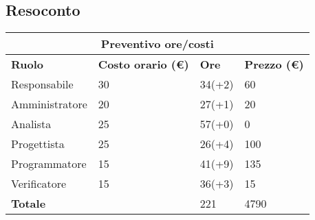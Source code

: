 \documentclass[12pt]{article}
\begin{document}
\subsection{Resoconto}
\begin{center}
    \begin{tabularx}{\textwidth}{|X|X|X|X|}
        \hline
        \multicolumn{4}{|c|}{\textbf{Preventivo ore/costi}}\\
        \hline
        \hline
        \textbf{Ruolo} & \textbf{Costo orario (\euro)} & \textbf{Ore} & \textbf{Prezzo (\euro)}\\
        \hline
        Responsabile    & 30 & 34(+2)  & 60\\
        \hline
        Amministratore  & 20 & 27(+1)  & 20\\
        \hline
        Analista        & 25 & 57(+0)  & 0\\
        \hline
        Progettista     & 25 & 26(+4)  & 100\\
        \hline
        Programmatore   & 15 & 41(+9)  & 135\\
        \hline
        Verificatore    & 15 & 36(+3)  & 15\\
        \hline
        \hline
        \textbf{Totale} &    & 221 &  4790 \\
        \hline
    \end{tabularx}\\[8pt]
    \mbox{}\\
\end{center}
\end{document}
